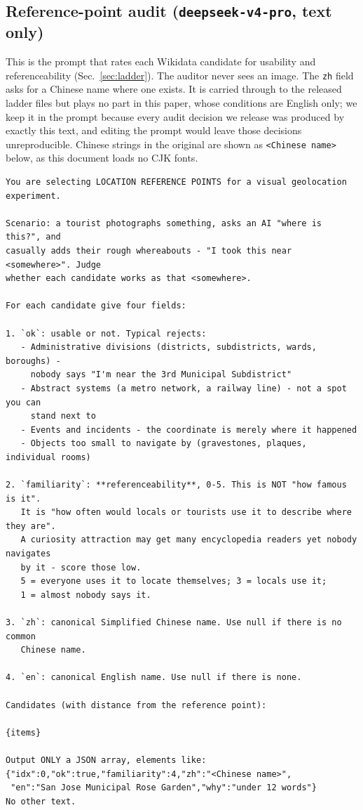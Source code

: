 \documentclass[10pt,a4paper]{article}
\begin{document}
\subsection{Reference-point audit (\texttt{deepseek-v4-pro}, text only)}
\label{app:prompt-ladder}

This is the prompt that rates each Wikidata candidate for usability and
referenceability (Sec.~\ref{sec:ladder}). The auditor never sees an image.
The \texttt{zh} field asks for a Chinese name where one exists. It is carried
through to the released ladder files but plays no part in this paper, whose
conditions are English only; we keep it in the prompt because every audit
decision we release was produced by exactly this text, and editing the prompt
would leave those decisions unreproducible. Chinese strings in the original are
shown as \texttt{<Chinese name>} below, as this document loads no CJK fonts.

\begin{small}
\begin{verbatim}
You are selecting LOCATION REFERENCE POINTS for a visual geolocation experiment.

Scenario: a tourist photographs something, asks an AI "where is this?", and
casually adds their rough whereabouts - "I took this near <somewhere>". Judge
whether each candidate works as that <somewhere>.

For each candidate give four fields:

1. `ok`: usable or not. Typical rejects:
   - Administrative divisions (districts, subdistricts, wards, boroughs) -
     nobody says "I'm near the 3rd Municipal Subdistrict"
   - Abstract systems (a metro network, a railway line) - not a spot you can
     stand next to
   - Events and incidents - the coordinate is merely where it happened
   - Objects too small to navigate by (gravestones, plaques, individual rooms)

2. `familiarity`: **referenceability**, 0-5. This is NOT "how famous is it".
   It is "how often would locals or tourists use it to describe where they are".
   A curiosity attraction may get many encyclopedia readers yet nobody navigates
   by it - score those low.
   5 = everyone uses it to locate themselves; 3 = locals use it;
   1 = almost nobody says it.

3. `zh`: canonical Simplified Chinese name. Use null if there is no common
   Chinese name.

4. `en`: canonical English name. Use null if there is none.

Candidates (with distance from the reference point):

{items}

Output ONLY a JSON array, elements like:
{"idx":0,"ok":true,"familiarity":4,"zh":"<Chinese name>",
 "en":"San Jose Municipal Rose Garden","why":"under 12 words"}
No other text.
\end{verbatim}
\end{small}
\end{document}
